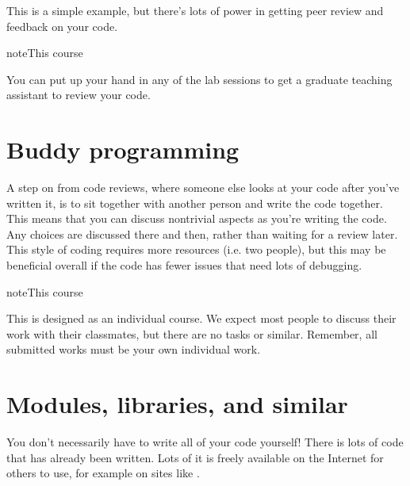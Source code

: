 \documentclass[letterpaper,10pt,british]{sphinxmanual}
\begin{document}
\sphinxAtStartPar
This is a simple example, but there’s lots of power in getting peer review and feedback on your code.

\begin{sphinxadmonition}{note}{This course}

\sphinxAtStartPar
You can put up your hand in any of the lab sessions to get a graduate teaching assistant to review your code.
\end{sphinxadmonition}

\sphinxstepscope


\section{Buddy programming}
\label{\detokenize{chapters/software_development_tools/buddy_programming:buddy-programming}}\label{\detokenize{chapters/software_development_tools/buddy_programming::doc}}
\sphinxAtStartPar
A step on from code reviews, where someone else looks at your code after you’ve written it, is to sit together with another person and write the code together. This means that you can discuss non\sphinxhyphen{}trivial aspects as you’re writing the code. Any choices are discussed there and then, rather than waiting for a review later. This style of coding requires more resources (i.e. two people), but this may be beneficial overall if the code has fewer issues that need lots of debugging.

\begin{sphinxadmonition}{note}{This course}

\sphinxAtStartPar
This is designed as an individual course. We expect most people to discuss their work with their classmates, but there are no  tasks or similar. Remember, all submitted works must be your own individual work.
\end{sphinxadmonition}

\sphinxstepscope


\section{Modules, libraries, and similar}
\label{\detokenize{chapters/software_development_tools/libraries:modules-libraries-and-similar}}\label{\detokenize{chapters/software_development_tools/libraries:libraries}}\label{\detokenize{chapters/software_development_tools/libraries::doc}}
\sphinxAtStartPar
You don’t necessarily have to write all of your code yourself! There is lots of code that has already been written. Lots of it is freely available on the Internet for others to use, for example on sites like .
\end{document}

